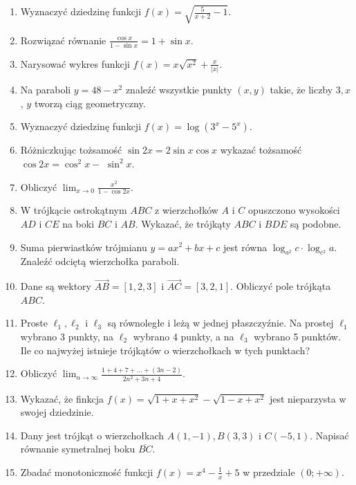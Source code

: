 \documentclass[10pt]{article}
\begin{document}
\begin{enumerate}
  \item Wyznaczyć dziedzinę funkcji \(f(x)=\sqrt{\frac{5}{x+2}-1}\).
  \item Rozwiązać równanie \(\frac{\cos x}{1-\sin x}=1+\sin x\).
  \item Narysować wykres funkcji \(f(x)=x \sqrt{x^{2}}+\frac{x}{|x|}\).
  \item Na paraboli \(y=48-x^{2}\) znaleźć wszystkie punkty \((x, y)\) takie, że liczby \(3, x\), \(y\) tworzą ciąg geometryczny.
  \item Wyznaczyć dziedzinę funkcji \(f(x)=\log \left(3^{x}-5^{x}\right)\).
  \item Różniczkując tożsamość \(\sin 2 x=2 \sin x \cos x\) wykazać tożsamość \(\cos 2 x=\cos ^{2} x-\) \(\sin ^{2} x\).
  \item Obliczyć \(\lim _{x \rightarrow 0} \frac{x^{2}}{1-\cos 2 x}\).
  \item W trójkącie ostrokątnym \(A B C\) z wierzchołków \(A\) i \(C\) opuszczono wysokości \(A D\) i \(C E\) na boki \(B C\) i \(A B\). Wykazać, że trójkąty \(A B C\) i \(B D E\) są podobne.
  \item Suma pierwiastków trójmianu \(y=a x^{2}+b x+c\) jest równa \(\log _{a^{2}} c \cdot \log _{c^{2}} a\). Znaleźć odciętą wierzchołka paraboli.
  \item Dane są wektory \(\overrightarrow{A B}=[1,2,3]\) i \(\overrightarrow{A C}=[3,2,1]\). Obliczyć pole trójkąta \(A B C\).
  \item Proste \(\ell_{1}, \ell_{2}\) i \(\ell_{3}\) są równoległe i leżą w jednej płaszczyźnie. Na prostej \(\ell_{1}\) wybrano 3 punkty, na \(\ell_{2}\) wybrano 4 punkty, a na \(\ell_{3}\) wybrano 5 punktów. Ile co najwyżej istnieje trójkątów o wierzchołkach w tych punktach?
  \item Obliczyć \(\lim _{n \rightarrow \infty} \frac{1+4+7+\ldots+(3 n-2)}{2 n^{2}+3 n+4}\).
  \item Wykazać, że finkcja \(f(x)=\sqrt{1+x+x^{2}}-\sqrt{1-x+x^{2}}\) jest nieparzysta w swojej dziedzinie.
  \item Dany jest trójkąt o wierzchołkach \(A(1,-1), B(3,3)\) i \(C(-5,1)\). Napisać równanie symetralnej boku \(\overline{B C}\).
  \item Zbadać monotoniczność funkcji \(f(x)=x^{4}-\frac{1}{x}+5\) w przedziale \((0 ;+\infty)\).
\end{enumerate}
\end{document}
